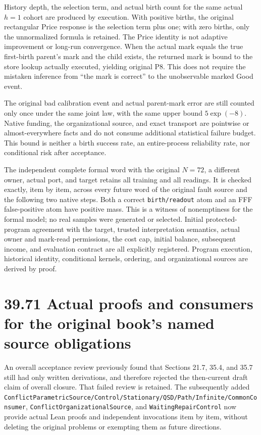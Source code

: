 \documentclass[
  english,
  11pt,
  oneside]{book}
\newcounter{none} %
\begin{document}
History depth, the selection term, and actual birth count for the same actual \(h=1\) cohort are produced by execution. With positive births, the original rectangular Price response is the selection term plus one; with zero births, only the unnormalized formula is retained. The Price identity is not adaptive improvement or long-run convergence. When the actual mark equals the true first-birth parent's mark and the child exists, the returned mark is bound to the store lookup actually executed, yielding original P8. This does not require the mistaken inference from ``the mark is correct'' to the unobservable marked Good event.

The original bad calibration event and actual parent-mark error are still counted only once under the same joint law, with the same upper bound \(5\exp(-8)\). Native funding, the organizational source, and exact transport are pointwise or almost-everywhere facts and do not consume additional statistical failure budget. This bound is neither a birth success rate, an entire-process reliability rate, nor conditional risk after acceptance.

The independent complete formal word with the original \(N=72\), a different owner, actual port, and target retains all training and all readings. It is checked exactly, item by item, across every future word of the original fault source and the following two native steps. Both a correct \nolinkurl{birth/readout} atom and an FFF false-positive atom have positive mass. This is a witness of nonemptiness for the formal model; no real samples were generated or selected. Initial protected-program agreement with the target, trusted interpretation semantics, actual owner and mark-read permissions, the cost cap, initial balance, subsequent income, and evaluation contract are all explicitly registered. Program execution, historical identity, conditional kernels, ordering, and organizational sources are derived by proof.

\section{39.71 Actual proofs and consumers for the original book's named source obligations}\label{actual-proofs-and-consumers-for-the-original-books-named-source-obligations}

An overall acceptance review previously found that Sections 21.7, 35.4, and 35.7 still had only written derivations, and therefore rejected the then-current draft claim of overall closure. That failed review is retained. The subsequently added \nolinkurl{ConflictParametricSource/Control/Stationary/QSD/Path/Infinite/CommonConsumer}, \nolinkurl{ConflictOrganizationalSource}, and \nolinkurl{WaitingRepairControl} now provide actual Lean proofs and independent invocations item by item, without deleting the original problems or exempting them as future directions.
\end{document}
